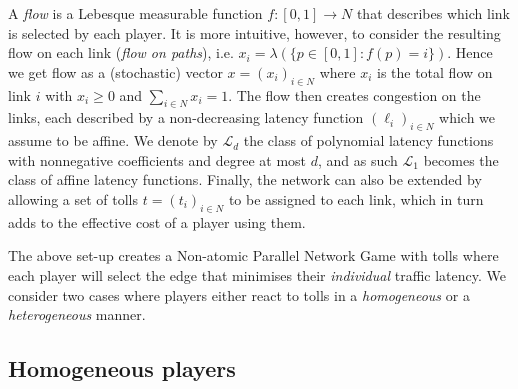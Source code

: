 \documentclass[10pt,a4paper]{book}
\theoremstyle{definition}
\theoremstyle{comment}
\begin{document}
A \textit{flow} is a Lebesque measurable function $f: [0, 1] \rightarrow N$ that describes which link is selected by each player.
It is more intuitive, however, to consider the resulting flow on each link (\textit{flow on paths}), i.e. $x_i = \lambda(\{p \in [0, 1]: f(p) = i\})$.
Hence we get flow as a (stochastic) vector $x = (x_i)_{i \in N}$ where $x_i$ is the total flow on link $i$ with $x_i \geq 0$ and $\sum_{i \in N}x_i = 1$.
The flow then creates congestion on the links, each described by a non-decreasing latency function $(\ell_i)_{i \in N}$ which we assume to be affine.
We denote by $\mathcal{L}_d$ the class of polynomial latency functions with nonnegative coefficients and degree at most $d$, and as such $\mathcal{L}_1$ becomes the class of affine latency functions.
Finally, the network can also be extended by allowing a set of tolls $t = (t_i)_{i \in N}$ to be assigned to each link, which in turn adds to the effective cost of a player using them.

The above set-up creates a Non-atomic Parallel Network Game with tolls where each player will select the edge that minimises their \textit{individual} traffic latency.
We consider two cases where players either react to tolls in a \textit{homogeneous} or a \textit{heterogeneous} manner.

\subsection*{Homogeneous players}
\end{document}
